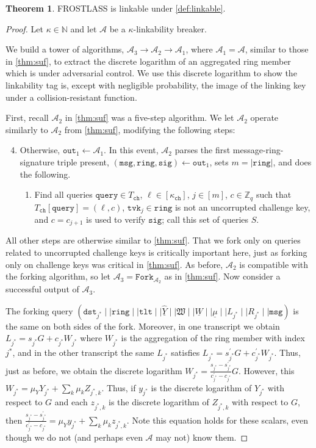 \documentclass[11pt]{article}
\theoremstyle{definition}
\newtheorem{theorem}{Theorem}[section]
\newcommand{\tlt}{\texttt{tlt}}
\newcommand{\tvk}{\texttt{tvk}}
\newcommand{\ring}{\texttt{ring}}
\newcommand{\sig}{\texttt{sig}}
\newcommand{\Zq}{\mathbb{Z}_q}
\newcommand{\msg}{\texttt{msg}}
\newcommand{\signaturequerystar}{(\texttt{dst}_{j^*} \mid \mid \ring \mid \mid \tlt \mid \mid \underline{\widehat{Y}} \mid \mid \mathfrak{W} \mid \mid \underline{W} \mid \mid \underline{\mu} \mid \mid L_{j^*} \mid \mid R_{j^*} \mid \mid \msg)}
\begin{document}
\begin{theorem}
FROSTLASS is linkable under \cref{def:linkable}. 
\end{theorem}
\begin{proof}
Let $\kappa \in \mathbb{N}$ and let $\mathcal{A}$ be a $\kappa$-linkability breaker. 

We build a tower of algorithms, $\mathcal{A}_3 \to \mathcal{A}_2 \to \mathcal{A}_1$, where $\mathcal{A}_1 = \mathcal{A}$, similar to those in \cref{thm:suf}, to extract the discrete logarithm of an aggregated ring member which is under adversarial control. We use this discrete logarithm to show the linkability tag is, except with negligible probability, the image of the linking key under a collision-resistant function.

First, recall $\mathcal{A}_2$ in \cref{thm:suf} was a five-step algorithm. We let $\mathcal{A}_2$ operate similarly to $\mathcal{A}_2$ from \cref{thm:suf}, modifying the following steps:
\begin{enumerate}
\setcounter{enumi}{3}
\item Otherwise, $\texttt{out}_1 \leftarrow \mathcal{A}_1$. In this event, $\mathcal{A}_2$ parses the first message-ring-signature triple present, $(\msg, \ring, \sig) \leftarrow \texttt{out}_1$, sets $m = \left|\ring\right|$, and does the following.
\begin{enumerate}
\item Find all queries $\texttt{query} \in T_{\texttt{ch}}$, $\ell \in [\kappa_{\texttt{ch}}]$, $j \in [m]$, $c \in \Zq$ such that $T_{\texttt{ch}}[\texttt{query}] = (\ell, c)$, $\tvk_j \in \ring$ is not an uncorrupted challenge key, and $c=c_{j+1}$ is used to verify $\sig$; call this set of queries $S$.
\end{enumerate}
\end{enumerate}
All other steps are otherwise similar to \cref{thm:suf}. That we fork only on queries related to uncorrupted challenge keys is critically important here, just as forking only on challenge keys was critical in \cref{thm:suf}. As before, $\mathcal{A}_2$ is compatible with the forking algorithm, so let $\mathcal{A}_3 = \texttt{Fork}_{\mathcal{A}_2}$ as in \cref{thm:suf}. Now consider a successful output of $\mathcal{A}_3$. 

The forking query  $\signaturequerystar$ is the same on both sides of the fork. Moreover, in one transcript we obtain $L_{j^*} = s_{j^*} G + c_{j^*} W_{j^*}$ where $W_{j^*}$ is the aggregation of the ring member with index $j^*$, and in the other transcript the same $L_{j^*}$ satisfies $L_{j^*} = s_{j^*}^\prime G + c_{j^*}^\prime W_{j^*}$. Thus, just as before, we obtain the discrete logarithm $W_{j^*} = \frac{s_{j^*} - s_{j^*}^\prime}{c_{j^*}^\prime - c_{j^*}}G$. However, this $W_{j^*} = \mu_Y Y_{j^*} + \sum_k \mu_k Z_{j^*,k}$. Thus, if $y_{j^*}$ is the discrete logarithm of $Y_{j^*}$ with respect to $G$ and each $z_{j^*,k}$ is the discrete logarithm of $Z_{j^*,k}$ with respect to $G$, then $\frac{s_{j^*} - s_{j^*}^\prime}{c_{j^*}^\prime - c_{j^*}} = \mu_Y y_{j^*} + \sum_k \mu_k z_{j^*,k}$. Note this equation holds for these scalars, even though we do not (and perhaps even $\mathcal{A}$ may not) know them.


\end{proof}
\end{document}
